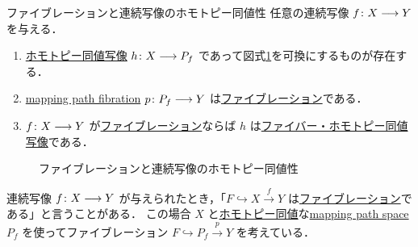 \documentclass[algtopo_main]{subfiles}
\begin{document}
\begin{mytheo}[label=thm:continuous-fibration]{ファイブレーションと連続写像のホモトピー同値性}
    任意の連続写像 $f \colon X \longrightarrow Y$ を与える．
    \begin{enumerate}
        \item \hyperref[def:homotopy-basic]{ホモトピー同値写像} $h \colon X \longrightarrow P_f$ であって図式\ref{cmtd:continuous-fibration}を可換にするものが存在する．
        \item \hyperref[def:mapping-path-space]{mapping path fibration} $p \colon P_f \longrightarrow Y$ は\hyperref[def:fibration]{ファイブレーション}である．
        \item $f \colon X \longrightarrow Y$ が\hyperref[def:fibration]{ファイブレーション}ならば $h$ は\hyperref[def:fib-homotopy]{ファイバー・ホモトピー同値写像}である．
    \end{enumerate}
\end{mytheo}

\begin{figure}[H]
    \centering
    \caption{ファイブレーションと連続写像のホモトピー同値性}
    \label{cmtd:continuous-fibration}
\end{figure}%

\begin{marker}
    連続写像 $f \colon X \longrightarrow Y$ が与えられたとき，「$F \hookrightarrow X \xrightarrow{f} Y$ は\hyperref[def:fibration]{ファイブレーション}である」と言うことがある．
    この場合 $X$ と\hyperref[def:homotopy-basic]{ホモトピー同値}な\hyperref[def:mapping-path-space]{mapping path space} $P_f$ を使ってファイブレーション $F \hookrightarrow P_f \xrightarrow{p} Y$ を考えている．
\end{marker}
\end{document}
